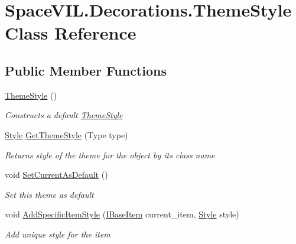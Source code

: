 \hypertarget{class_space_v_i_l_1_1_decorations_1_1_theme_style}{}\section{Space\+V\+I\+L.\+Decorations.\+Theme\+Style Class Reference}
\label{class_space_v_i_l_1_1_decorations_1_1_theme_style}
\subsection*{Public Member Functions}
\begin{DoxyCompactItemize}
\item 
\mbox{\hyperlink{class_space_v_i_l_1_1_decorations_1_1_theme_style_a95d8f9c2056dc143d38e3faa0aa2aa68}{Theme\+Style}} ()
\begin{DoxyCompactList}\small\item\em Constructs a default \mbox{\hyperlink{class_space_v_i_l_1_1_decorations_1_1_theme_style}{Theme\+Style}} \end{DoxyCompactList}\item 
\mbox{\hyperlink{class_space_v_i_l_1_1_decorations_1_1_style}{Style}} \mbox{\hyperlink{class_space_v_i_l_1_1_decorations_1_1_theme_style_afd4b26105e93f1a9353006a7d5b31c52}{Get\+Theme\+Style}} (Type type)
\begin{DoxyCompactList}\small\item\em Returns style of the theme for the object by its class name \end{DoxyCompactList}\item 
void \mbox{\hyperlink{class_space_v_i_l_1_1_decorations_1_1_theme_style_a312be537f84b10d03a304cb3f1af9710}{Set\+Current\+As\+Default}} ()
\begin{DoxyCompactList}\small\item\em Set this theme as default \end{DoxyCompactList}\item 
void \mbox{\hyperlink{class_space_v_i_l_1_1_decorations_1_1_theme_style_a8ee4f3aa3cdaaa79d5fe355bffb5ded8}{Add\+Specific\+Item\+Style}} (\mbox{\hyperlink{interface_space_v_i_l_1_1_core_1_1_i_base_item}{I\+Base\+Item}} current\+\_\+item, \mbox{\hyperlink{class_space_v_i_l_1_1_decorations_1_1_style}{Style}} style)
\begin{DoxyCompactList}\small\item\em Add unique style for the item \end{DoxyCompactList}\item 

\end{DoxyCompactItemize}
